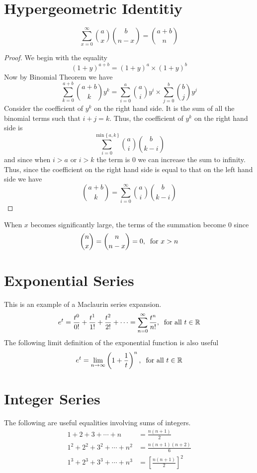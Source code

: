 \section{Hypergeometric Identitiy}
\[
    \sum_{x = 0}^{\infty} \binom{a}{x} \binom{b}{n-x} = \binom{a + b}{n}
\]
\begin{proof}
We begin with the equality
\[
    (1 + y)^{a + b} = (1 + y)^a \times (1 + y)^b
\]
Now by Binomial Theorem we have
\[
    \sum_{k = 0}^{a + b} \binom{a + b}{k} y^k = \sum_{i = 0}^{a} \binom{a}{i} y^i \times \sum_{j = 0}^{b} \binom{b}{j} y^j
\]
Consider the coefficient of $y^k$ on the right hand side. It is the sum of all the binomial terms such that $i + j = k$. Thus, the coefficient of $y^k$ on the right hand side is
\[
    \sum_{i = 0}^{\min\{\, a,k \,\}} \binom{a}{i} \binom{b}{k-i}
\]
and since when $i > a$ or $i > k$ the term is 0 we can increase the sum to infinity. Thus, since the coefficient on the right hand side is equal to that on the left hand side we have
\[
    \binom{a + b}{k} = \sum_{i = 0}^{\infty} \binom{a}{i} \binom{b}{k-i}
\]
\end{proof}
\begin{info}
When $x$ becomes significantly large, the terms of the summation become 0 since 
\[
    \binom{n}{x} = \binom{n}{n-x} = 0,\:\text{ for } x > n
\]
\end{info}
\section{Exponential Series}
This is an example of a Maclaurin series expansion.
\[
    e^t = \frac{t^0}{0!} + \frac{t^1}{1!} + \frac{t^2}{2!} + \cdots = \sum_{n = 0}^{\infty} \frac{t^n}{n!},\:\text{ for }\text{all } t\in\mathbb{R}
\]
The following limit definition of the exponential function is also useful
\[
    e^t = \lim_{n \rightarrow \infty}\left(1 + \frac{1}{t}\right)^n,\:\text{ for }\text{all } t\in\mathbb{R}
\]
\section{Integer Series}
The following are useful equalities involving sums of integers.
\begin{align*}
    1 + 2 + 3 + \cdots + n &= \frac{n(n+1)}{2} \\
    1^2 + 2^2 + 3^2 + \cdots + n^2 &= \frac{n(n+1)(n+2)}{6} \\
    1^3 + 2^3 + 3^3 + \cdots + n^3 &= \left[\frac{n(n+1)}{2}\right]^2
\end{align*}